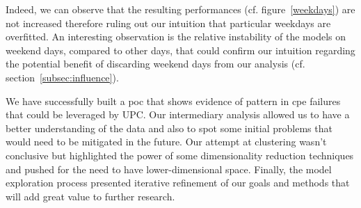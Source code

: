 Indeed, we can observe that the resulting performances (cf. figure~\ref{weekdays}) are not increased therefore ruling out our intuition that particular weekdays are overfitted. An interesting observation is the relative instability of the models on weekend days, compared to other days, that could confirm our intuition regarding the potential benefit of discarding weekend days from our analysis (cf. section~\ref{subsec:influence}). 

\vspace{\baselineskip}
We have successfully built a \acrlong{poc} that shows evidence of pattern in \acrshort{cpe} failures that could be leveraged by UPC. Our intermediary analysis allowed us to have a better understanding of the data and also to spot some initial problems that would need to be mitigated in the future. Our attempt at clustering wasn’t conclusive but highlighted the power of some dimensionality reduction techniques and pushed for the need to have lower-dimensional space. Finally, the model exploration process presented iterative refinement of our goals and methods that will add great value to further research. 